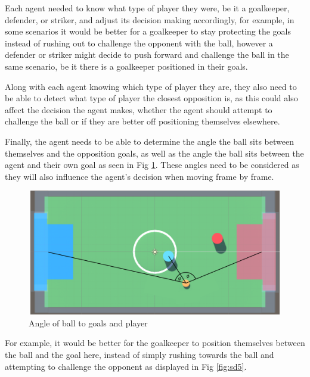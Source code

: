 \begin{flushleft}
Each agent needed to know what type of player they were, be it a goalkeeper, defender, or striker, and adjust its decision making accordingly, for example, in some scenarios it would be better for a goalkeeper to stay protecting the goals instead of rushing out to challenge the opponent with the ball, however a defender or striker might decide to push forward and challenge the ball in the same scenario, be it there is a goalkeeper positioned in their goals.

Along with each agent knowing which type of player they are, they also need to be able to detect what type of player the closest opposition is, as this could also affect the decision the agent makes, whether the agent should attempt to challenge the ball or if they are better off positioning themselves elsewhere.

Finally, the agent needs to be able to determine the angle the ball sits between themselves and the opposition goals, as well as the angle the ball sits between the agent and their own goal as seen in Fig \ref{fig:sd4}. These angles need to be considered as they will also influence the agent’s decision when moving frame by frame.
\end{flushleft}

\begin{figure}[H]
    \centering
    \includegraphics[width=115mm, height=55mm]{img/Image5.png}
    \caption{Angle of ball to goals and player}
    \label{fig:sd4}
\end{figure}

\begin{flushleft}
For example, it would be better for the goalkeeper to position themselves between the ball and the goal here, instead of simply rushing towards the ball and attempting to challenge the opponent as displayed in Fig \ref{fig:sd5}.
\end{flushleft}

